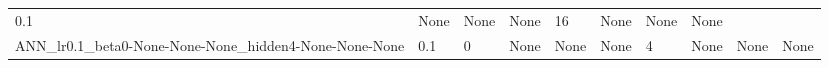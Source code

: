 \documentclass[11pt, a4paper , landscape]{article}
\begin{document}
\begin{longtable}[]{@{}llllllllll@{}}
\begin{minipage}[t]{0.04\columnwidth}
0.1\strut
\end{minipage} & \begin{minipage}[t]{0.05\columnwidth}\raggedright\strut
None\strut
\end{minipage} & \begin{minipage}[t]{0.05\columnwidth}\raggedright\strut
None\strut
\end{minipage} & \begin{minipage}[t]{0.05\columnwidth}\raggedright\strut
None\strut
\end{minipage} & \begin{minipage}[t]{0.10\columnwidth}\raggedright\strut
16\strut
\end{minipage} & \begin{minipage}[t]{0.10\columnwidth}\raggedright\strut
None\strut
\end{minipage} & \begin{minipage}[t]{0.09\columnwidth}\raggedright\strut
None\strut
\end{minipage} & \begin{minipage}[t]{0.11\columnwidth}\raggedright\strut
None\strut
\end{minipage}\tabularnewline
\begin{minipage}[t]{0.04\columnwidth}\raggedright\strut
ANN\_lr0.1\_beta0-None-None-None\_hidden4-None-None-None\strut
\end{minipage} & \begin{minipage}[t]{0.09\columnwidth}\raggedright\strut
0.1\strut
\end{minipage} & \begin{minipage}[t]{0.04\columnwidth}\raggedright\strut
0\strut
\end{minipage} & \begin{minipage}[t]{0.05\columnwidth}\raggedright\strut
None\strut
\end{minipage} & \begin{minipage}[t]{0.05\columnwidth}\raggedright\strut
None\strut
\end{minipage} & \begin{minipage}[t]{0.05\columnwidth}\raggedright\strut
None\strut
\end{minipage} & \begin{minipage}[t]{0.10\columnwidth}\raggedright\strut
4\strut
\end{minipage} & \begin{minipage}[t]{0.10\columnwidth}\raggedright\strut
None\strut
\end{minipage} & \begin{minipage}[t]{0.09\columnwidth}\raggedright\strut
None\strut
\end{minipage} & \begin{minipage}[t]{0.11\columnwidth}\raggedright\strut
None\strut
\end{minipage}\tabularnewline
\bottomrule
\end{longtable}
\end{document}
